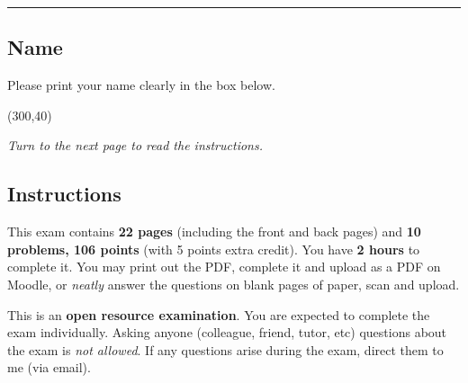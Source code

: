 \documentclass[12pt,twoside]{article}
\newcommand{\?}{\stackrel{?}{=}}
\newcommand{\class}{CEE 260/MIE 273: Probability \& Statistics in Civil Engineering}
\newcommand{\examnum}{Midterm Exam}
\begin{document}
\title{\vspace{-5ex}{\sc \examnum}}
\author{\bf \class}
\date{October 14, 2025\\[4mm]
   {\sc time limit:} {\bf \sc Two Hours}
}
%
\clearpage
\maketitle
\noindent\rule[1ex]{\textwidth}{.1pt}
\subsection*{Name}
Please print your name clearly in the box below.\\
\begin{center}
  \framebox(300,40){\Huge\phantom{t}} \\
  \vspace{2ex}
\end{center}

\vspace{40ex}
{\it Turn to the next page to read the instructions.}
\thispagestyle{empty}


\eject
\subsection*{Instructions}
This exam contains\textbf{ 22 pages} (including the front and back pages) and \textbf{10 problems, 106 points} (with 5 points extra credit). You have {\bf 2 hours} to complete it.  You may print out the PDF, complete it and upload as a
PDF on Moodle, or \textit{neatly} answer the questions on blank pages of paper, scan and upload.

\noindent This is an \textbf{open resource examination}. You are expected to complete the exam individually. Asking
anyone (colleague, friend, tutor, etc) questions about the exam is \textit{not allowed}. If any questions arise during the exam, direct them to me (via email).
\\
 
\end{document}
